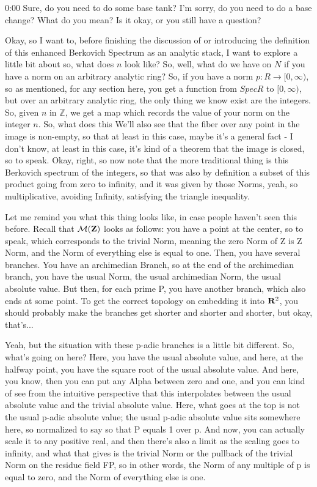 \begin{unfinished}{0:00}
Sure, do you need to do some base tank? I'm sorry, do you need to do a base change? What do you mean? Is it okay, or you still have a question?

Okay, so I want to, before finishing the discussion of or introducing the definition of this enhanced Berkovich Spectrum as an analytic stack, I want to explore a little bit about so, what does $n$ look like? So, well, what do we have on $N$ if you have a norm on an arbitrary analytic ring? So, if you have a norm $p: R \to [0, \infty)$, so as mentioned, for any section here, you get a function from $Spec R$ to $[0, \infty)$, but over an arbitrary analytic ring, the only thing we know exist are the integers. So, given $n$ in $\mathbb{Z}$, we get a map which records the value of your norm on the integer $n$. So, what does this
We'll also see that the fiber over any point in the image is non-empty, so that at least in this case, maybe it's a general fact - I don't know, at least in this case, it's kind of a theorem that the image is closed, so to speak. Okay, right, so now note that the more traditional thing is this Berkovich spectrum of the integers, so that was also by definition a subset of this product going from zero to infinity, and it was given by those Norms, yeah, so multiplicative, avoiding Infinity, satisfying the triangle inequality.

Let me remind you what this thing looks like, in case people haven't seen this before. Recall that $\mathcal M(\mathbf Z)$ looks as follows: you have a point at the center, so to speak, which corresponds to the trivial Norm, meaning the zero Norm of Z is Z Norm, and the Norm of everything else is equal to one. Then, you have several branches. You have an archimedian Branch, so at the end of the archimedian branch, you have the usual Norm, the usual archimedian Norm, the usual absolute value. But then, for each prime P, you have another branch, which also ends at some point. To get the correct topology on embedding it into $\mathbf R^2$, you should probably make the branches get shorter and shorter and shorter, but okay, that's...

Yeah, but the situation with these p-adic branches is a little bit different. So, what's going on here? Here, you have the usual absolute value, and here, at the halfway point, you have the square root of the usual absolute value. And here, you know, then you can put any Alpha between zero and one, and you can kind of see from the intuitive perspective that this interpolates between the usual absolute value and the trivial absolute value. Here, what goes at the top is not the usual p-adic absolute value; the usual p-adic absolute value sits somewhere here, so normalized to say so that P equals 1 over p. And now, you can actually scale it to any positive real, and then there's also a limit as the scaling goes to infinity, and what that gives is the trivial Norm or the pullback of the trivial Norm on the residue field FP, so in other words, the Norm of any multiple of p is equal to zero, and the Norm of everything else is one.


\end{unfinished}
